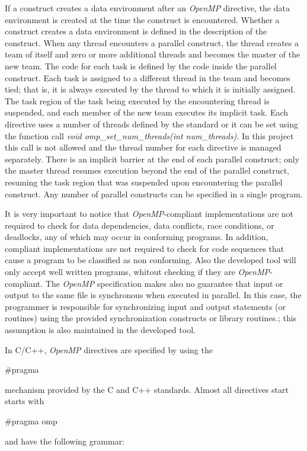 \documentclass[a4paper,11pt,oneside]{book}
\begin{document}
If a construct creates a data environment after an \emph{OpenMP} directive, the data environment is created at the time the construct is encountered. Whether a construct creates a data environment is defined in the description of the construct. When any thread encounters a parallel construct, the thread creates a team of itself and zero or more additional threads and becomes the master of the new team. The code for each task is defined by the code inside the parallel construct. Each task is assigned to a different thread in the team and becomes tied; that is, it is always executed by the thread to which it is initially assigned. The task region of the task being executed by the encountering thread is suspended, and each member of the new team executes its implicit task. Each directive uses a number of threads defined by the standard or it can be set using the function call \emph{void omp\_set\_num\_threads(int num\_threads)}. In this project this call is not allowed and the thread number for each directive is managed separately. There is an implicit barrier at the end of each parallel construct; only the master thread resumes execution beyond the end of the parallel construct, resuming the task region that was suspended upon encountering the parallel construct. Any number of parallel constructs can be specified in a single program. 

It is very important to notice that \emph{OpenMP}-compliant implementations are not required to check for data dependencies, data conflicts, race conditions, or deadlocks, any of which may occur in conforming programs. In addition, compliant implementations are not required to check for code sequences that cause a program to be classified as non conforming. Also the developed tool will only accept well written programs, whitout checking if they are \emph{OpenMP}-compliant. The \emph{OpenMP} specification makes also no guarantee that input or output to the same file is synchronous when executed in parallel. In this case, the programmer is responsible for synchronizing input and output statements (or routines) using the provided synchronization constructs or library routines.; this assumption is also maintained in the developed tool.

In C/C++, \emph{OpenMP} directives are specified by using the\begin{bf} $\#$pragma\end{bf} mechanism provided by the C and C++ standards.  Almost all directives start starts with \begin{bf}$\#$pragma omp\end{bf} and have the following grammar:
\begin{bf}{}\end{bf}
\\
\end{document}
